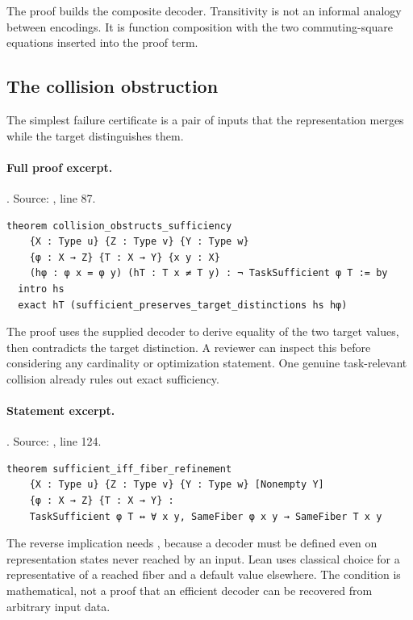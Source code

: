 \documentclass[11pt]{article}
\begin{document}
The proof builds the composite decoder. Transitivity is not an informal
analogy between encodings. It is function composition with the two
commuting-square equations inserted into the proof term.

\subsection{The collision obstruction}
The simplest failure certificate is a pair of inputs that the representation
merges while the target distinguishes them.

\paragraph{Full proof excerpt.}. Source: , line 87.
\begin{lstlisting}[style=AVOCSource]
theorem collision_obstructs_sufficiency
    {X : Type u} {Z : Type v} {Y : Type w}
    {φ : X → Z} {T : X → Y} {x y : X}
    (hφ : φ x = φ y) (hT : T x ≠ T y) : ¬ TaskSufficient φ T := by
  intro hs
  exact hT (sufficient_preserves_target_distinctions hs hφ)
\end{lstlisting}


The proof uses the supplied decoder to derive equality of the two target
values, then contradicts the target distinction. A reviewer can inspect this
before considering any cardinality or optimization statement. One genuine
task-relevant collision already rules out exact sufficiency.

\paragraph{Statement excerpt.}. Source: , line 124.
\begin{lstlisting}[style=AVOCSource]
theorem sufficient_iff_fiber_refinement
    {X : Type u} {Z : Type v} {Y : Type w} [Nonempty Y]
    {φ : X → Z} {T : X → Y} :
    TaskSufficient φ T ↔ ∀ x y, SameFiber φ x y → SameFiber T x y
\end{lstlisting}


The reverse implication needs , because a decoder must be
defined even on representation states never reached by an input. Lean uses
classical choice for a representative of a reached fiber and a default value
elsewhere. The condition is mathematical, not a proof that an efficient
decoder can be recovered from arbitrary input data.
\end{document}
